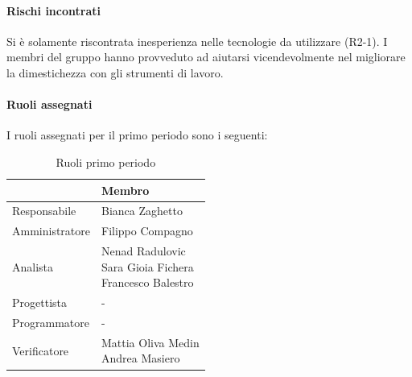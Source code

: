 \documentclass[a4paper,12pt]{article}
\begin{document}
            \paragraph*{Rischi incontrati}
                Si è solamente riscontrata inesperienza nelle tecnologie da utilizzare (R2-1). I membri del gruppo hanno provveduto ad aiutarsi vicendevolmente nel migliorare la dimestichezza con gli strumenti di lavoro.                
            \paragraph{Ruoli assegnati}
            I ruoli assegnati per il primo periodo sono i seguenti:
                \begin{table}[H]
                \centering
                \begin{tabular}{|l|l|}
                \hline
                    \rowcolor{lightgray}{\textbf{Ruolo}} & {\textbf{Membro}} \\
                \hline
                    Responsabile & Bianca Zaghetto \\
                \hline
                    Amministratore & Filippo Compagno \\
                \hline
                    Analista & \makecell[l]{Nenad Radulovic \\ Sara Gioia Fichera \\ Francesco Balestro} \\
                \hline
                    Progettista & - \\
                \hline
                    Programmatore & - \\
                \hline
                    Verificatore & \makecell[l]{Mattia Oliva Medin \\ Andrea Masiero} \\
                \hline
                \end{tabular}
                \caption{Ruoli primo periodo}
                \end{table}
            
\end{document}
